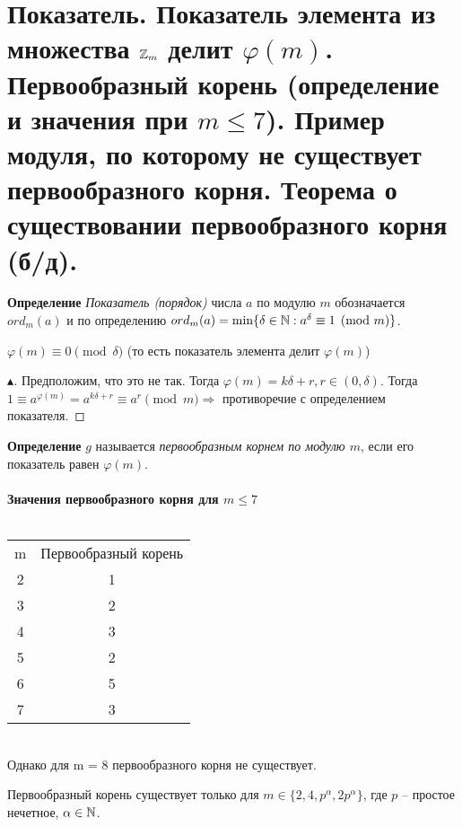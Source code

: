 \section{Показатель. Показатель элемента из множества $\mathbb{Z}_m$ делит $\varphi(m)$. Первообразный корень (определение и значения при $m \leq 7$). Пример модуля, по которому не существует первообразного корня. Теорема о существовании первообразного корня (б/д).}

\textbf{Определение} \textit{Показатель (порядок)} числа $a$ по модулю $m$ обозначается $ord_m(a)$ и по определению $ord_m(a) = \min \{\delta \in \mathbb{N}: a^{\delta} \equiv 1 \pmod m\}$.

\begin{proposition}
    $\varphi(m) \equiv 0 \pmod \delta$ (то есть показатель элемента делит $\varphi(m)$)
    \begin{proof}[$\blacktriangle$]
        Предположим, что это не так. Тогда $\varphi(m) = k\delta + r, r \in (0, \delta)$. Тогда $1 \equiv a^{\varphi(m)} = a ^ {k\delta + r} \equiv a^r \pmod  m \Rightarrow $ противоречие с определением показателя.
    \end{proof}
\end{proposition}

\textbf{Определение} $g$ называется \textit{первообразным корнем по модулю $m$}, если его показатель равен $\varphi(m)$.\\\\
\textbf{Значения первообразного корня для $m \leq 7$}\\\\
\begin{tabular}{c|c}
     m & Первообразный корень\\
     2 & 1\\
     3 & 2\\
     4 & 3\\
     5 & 2\\
     6 & 5\\
     7 & 3\\
\end{tabular} \\
Однако для m = 8 первообразного корня не существует.\\
\begin{theorem}
    Первообразный корень существует только для $m \in \{2, 4, p^{\alpha}, 2p^{\alpha}\}$, где $p$ -- простое нечетное, $\alpha \in \mathbb{N}$.
\end{theorem}


